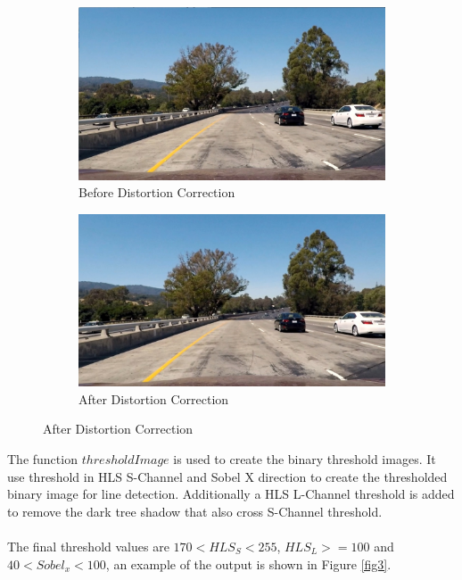\documentclass{article}
\begin{document}
\begin{figure}
     \centering
     \begin{subfigure}[b]{0.4\textwidth}
         \centering
         \includegraphics[width=\textwidth]{../test_images/test1.jpg}
         \caption{Before Distortion Correction}
         \label{fig2a}
     \end{subfigure}
     \hfill
     \begin{subfigure}[b]{0.4\textwidth}
         \centering
         \includegraphics[width=\textwidth]{../output_images/undistort/test1.jpg}
         \caption{After Distortion Correction}
         \label{fig2b}
     \end{subfigure}
\end{figure}
The function $thresholdImage$ is used to create the binary threshold images. It use threshold in HLS S-Channel and Sobel X direction to create the thresholded binary image for line detection.  Additionally a HLS L-Channel threshold is added to remove the dark tree shadow that also cross S-Channel threshold.\\\\
The final threshold values are $170<HLS_S<255$, $HLS_L>=100$ and $40<Sobel_x<100$, an example of the output is shown in Figure \ref{fig3}.\\
\end{document}
